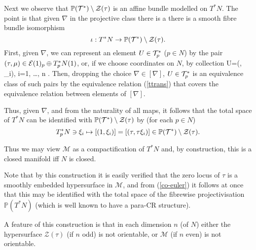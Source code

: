 Next we observe that $\mathbb{P}(\mathcal{T}^*)\setminus \mathcal{Z}(\tau)$ is an affine bundle modelled on $T^* N$.
The point is that given
  $\nabla$ in the projective class there is a  there is a smooth fibre bundle isomorphism
  \begin{equation}\label{key-id}
\iota : T^* N\to \mathbb{P}(\mathcal{T}^*)\setminus \mathcal{Z}(\tau).
    \end{equation}
First, given  $\nabla$, we can represent an element $U\in
  \mathcal{T}^*_p$ ($p\in N$) by the pair $(\tau , \mu) \in \mathcal{E} (1)_p\oplus
  T_p^*N(1)$,  or, if we choose coordinates on $N$, by collection
\be
\label{tractor_U}
U=(\tau, \mu_i), \quad i=1, \dots, n .
\ee
  Then, dropping the choice $\nabla \in [\nabla]$, $U\in
  \mathcal{T}^*_p$ is an equivalence class of such pairs by the equivalence
  relation (\ref{ttrans}) that covers the
  equivalence relation between elements of $[\nabla]$. 

  Thus, given $\nabla$, and  from the naturality of all maps, it
  follows that the total space of $T^*N$ can be identified with $\mathbb{P}(\mathcal{T}^*)\setminus \mathcal{Z}(\tau)$
  by (for each $p\in N$)
\begin{equation}
T_p^*N\ni \xi_i  \mapsto [(1,\xi_i)]=[(\tau,\tau \xi_i)]\in
\mathbb{P}(\mathcal{T}^*)\setminus \mathcal{Z}(\tau) .
\end{equation}

Thus we may view $\mathcal{M}$ as a
compactification of $T^*N$  and, by construction,
this is a closed manifold iff $N$ is closed.


Note that by this construction it is easily verified that the zero
locus of $\tau$ is a smoothly
embedded hypersurface in $\mathcal{M}$,  and from (\ref{co-euler}) it follows
at once that this may be identified with the total space of the
fibrewise projectivisation $\mathbb{P}(T^*N)$ (which is well known to
have a para-CR structure). 

A feature of this construction is that in each dimension $n$ (of $N$)
either the hypersurface $\mathcal{Z}(\tau)$ (if $n$ odd) is not
orientable, or $\mathcal{M}$ (if $n$ even) is not orientable. 

